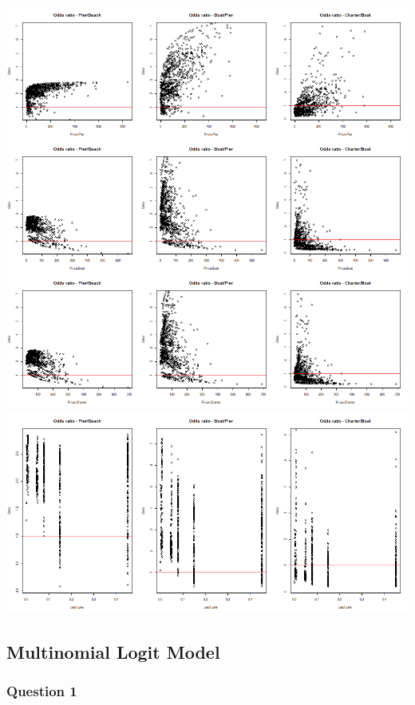 \documentclass[12pt]{article}
\begin{document}
{\includegraphics[scale=0.5]{Ordered Odds 2}\\
\includegraphics[scale=0.5]{Ordered Odds 3}\\


\subsection*{Multinomial Logit Model}
\subsubsection*{Question 1}

}
\end{document}

